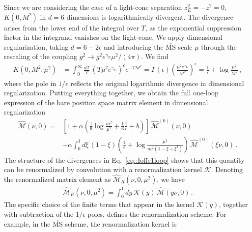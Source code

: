 Since we are considering the case of a light-cone separation $z_E^2 = -z^2 =0$,
$K\left(0,M^2\right)$ in $d =6$ dimensions is logarithmically divergent. The
divergence arises from the lower end of the integral over $T$, as the
exponential suppression factor in the integrand vanishes on the light-cone. We
apply dimensional regularization, taking $d = 6 -2\epsilon$ and
introducing the $\overline{\mathrm{MS}}$ scale $\mu$ through the rescaling of
the coupling $g^2\rightarrow g^2 e^{\gamma_E}\mu^2/(4\pi)$. We find
\begin{align}
        K\left(0, M^2; \mu^2\right) 
        &= \int_0^{\infty} \frac{dT}{T}\, 
        \left(T\mu^2e^{\gamma_E}\right)^{\epsilon}e^{-TM^2} 
        = \Gamma\left(\epsilon\right) 
        \left(\frac{\mu^2e^{\gamma_E}}{M^2}\right)^{\epsilon} 
        =\frac{1}{\epsilon} + \log\frac{\mu^2}{M^2}\, ,
\end{align}
where the pole in $1/\epsilon$ reflects the original logarithmic divergence in
dimensional regularization. Putting everything together, we obtain the full
one-loop expression of the bare position space matrix element in dimensional
regularization
\begin{align}
\label{eq::Ioffe1loop}
        \widehat{\mathcal{M}}\left(\nu, 0\right) 
        =& \left[1+ \alpha\left(\frac{1}{6}\log\frac{m^2}{\mu^2} 
        + \frac{1}{6}\frac{1}{\epsilon} + b\right)\right]\, 
        \widehat{\mathcal{M}}^{(0)}\left(\nu, 0\right)
        \nonumber \\ 
        & + \alpha \int_0^1 d\xi\,
        \left(1-\xi\right) \left(\frac{1}{\epsilon} + 
        \log\frac{\mu^2}{m^2\left(1-\xi+\xi^2\right)}\right)\, 
        \widehat{\mathcal{M}}^{(0)}\left(\xi \nu, 0\right)\, .
\end{align}
The structure of the divergences in Eq.~\eqref{eq::Ioffe1loop} shows that this
quantity can be renormalized by convolution with a renormalization kernel
$\mathcal{K}$. Denoting the renormalized matrix element as
$\widehat{\mathcal{M}}_R\left(\nu,0,\mu^2\right)$, we have
\begin{align}
        \widehat{\mathcal{M}}_R\left(\nu,0,\mu^2\right) = \int_0^1 dy\, 
        \mathcal{K}\left(y\right)\, 
        \widehat{\mathcal{M}}\left(y\nu, 0\right)\, .
\end{align}
The specific choice of the finite terms that appear in the kernel
$\mathcal{K}\left(y\right)$, together with subtraction of the $1/\epsilon$
poles, defines the renormalization scheme. For example, in the
$\overline{\mathrm{MS}}$ scheme, the renormalization kernel is
